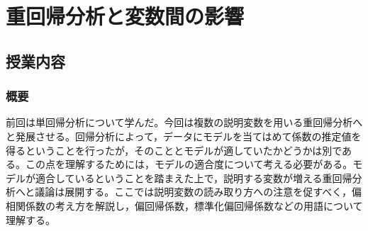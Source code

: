 \section{重回帰分析と変数間の影響}
\label{b08_MultipleRegression}

\subsection{授業内容}
\subsubsection{概要}
前回は単回帰分析について学んだ。今回は複数の説明変数を用いる重回帰分析へと発展させる。回帰分析によって，データにモデルを当てはめて係数の推定値を得るということを行ったが，そのこととモデルが適していたかどうかは別である。この点を理解するためには，モデルの適合度について考える必要がある。モデルが適合しているということを踏まえた上で，説明する変数が増える重回帰分析へと議論は展開する。ここでは説明変数の読み取り方への注意を促すべく，偏相関係数の考え方を解説し，偏回帰係数，標準化偏回帰係数などの用語について理解する。

